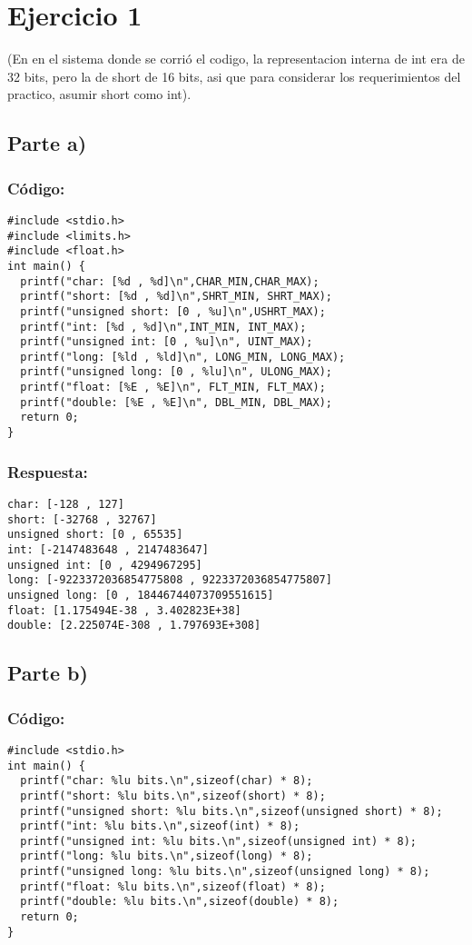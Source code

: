 \documentclass[letterpaper]{report}
\begin{document}
\section*{Ejercicio 1}
(En en el sistema donde se corrió el codigo, la representacion interna de int era de 32 bits, pero la de short de 16 bits, asi que para considerar los requerimientos del practico, asumir short como int).
\subsection*{Parte a)}
\subsubsection*{Código:}
\begin{verbatim}
#include <stdio.h>
#include <limits.h>
#include <float.h>
int main() {
  printf("char: [%d , %d]\n",CHAR_MIN,CHAR_MAX);
  printf("short: [%d , %d]\n",SHRT_MIN, SHRT_MAX);
  printf("unsigned short: [0 , %u]\n",USHRT_MAX);
  printf("int: [%d , %d]\n",INT_MIN, INT_MAX);
  printf("unsigned int: [0 , %u]\n", UINT_MAX);
  printf("long: [%ld , %ld]\n", LONG_MIN, LONG_MAX);
  printf("unsigned long: [0 , %lu]\n", ULONG_MAX);
  printf("float: [%E , %E]\n", FLT_MIN, FLT_MAX);
  printf("double: [%E , %E]\n", DBL_MIN, DBL_MAX);
  return 0;
}
\end{verbatim}
\subsubsection*{Respuesta:}
\begin{verbatim}
char: [-128 , 127]
short: [-32768 , 32767]
unsigned short: [0 , 65535]
int: [-2147483648 , 2147483647]
unsigned int: [0 , 4294967295]
long: [-9223372036854775808 , 9223372036854775807]
unsigned long: [0 , 18446744073709551615]
float: [1.175494E-38 , 3.402823E+38]
double: [2.225074E-308 , 1.797693E+308]
\end{verbatim}
\subsection*{Parte b)}
\subsubsection*{Código:}
\begin{verbatim}
#include <stdio.h>
int main() {
  printf("char: %lu bits.\n",sizeof(char) * 8);
  printf("short: %lu bits.\n",sizeof(short) * 8);
  printf("unsigned short: %lu bits.\n",sizeof(unsigned short) * 8);
  printf("int: %lu bits.\n",sizeof(int) * 8);
  printf("unsigned int: %lu bits.\n",sizeof(unsigned int) * 8);
  printf("long: %lu bits.\n",sizeof(long) * 8);
  printf("unsigned long: %lu bits.\n",sizeof(unsigned long) * 8);
  printf("float: %lu bits.\n",sizeof(float) * 8);
  printf("double: %lu bits.\n",sizeof(double) * 8);
  return 0;
}
\end{verbatim}
\pagebreak
\end{document}
